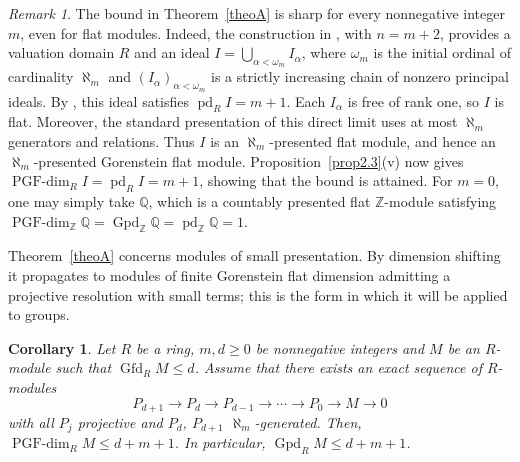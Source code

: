 \documentclass[12pt]{amsart}
\newtheorem{corollary}[theorem]{Corollary}
\theoremstyle{remark}
\newtheorem{remark}[theorem]{Remark}
\theoremstyle{definition}
\theoremstyle{plain}
\DeclareMathOperator{\Gfd}{Gfd}
\DeclareMathOperator{\Gpd}{Gpd}
\DeclareMathOperator{\pd}{pd}
\newcommand{\PGFdim}{\operatorname{PGF\text{-}dim}}
\newcommand{\Z}{\mathbb{Z}}
\newcommand{\Q}{\mathbb{Q}}
\newcommand{\alephm}{\aleph_m}
\begin{document}
\begin{remark}\label{rem4.2}The bound in Theorem~\ref{theoA} is sharp for every nonnegative
integer $m$, even for flat modules. Indeed, the construction
in \cite[proof of Proposition~2.62]{Oso}, with
$n=m+2$, provides a valuation domain $R$ and an ideal
$I=\bigcup_{\alpha<\omega_m}I_\alpha$,
where $\omega_m$ is the initial ordinal of cardinality
$\aleph_m$ and $(I_\alpha)_{\alpha<\omega_m}$ is a strictly
increasing chain of nonzero principal ideals.
By \cite[Theorem~2.57]{Oso}, this ideal satisfies
$\pd_RI=m+1$.
Each $I_\alpha$ is free of rank one, so $I$ is flat.
Moreover, the standard presentation of this direct limit
uses at most $\aleph_m$ generators and relations.
Thus $I$ is an $\aleph_m$-presented flat module, and hence
an $\aleph_m$-presented Gorenstein flat module.
Proposition~\ref{prop2.3}(v) now gives
$\PGFdim_RI
=\pd_RI
=m+1$,
showing that the bound is attained.
For $m=0$, one may simply take $\mathbb Q$, which is a
countably presented flat $\mathbb Z$-module satisfying
$\PGFdim_\Z\Q
=\Gpd_\Z\Q
=\pd_\Z\Q
=1$.
\end{remark}

Theorem~\ref{theoA} concerns modules of small presentation. By dimension shifting it propagates to modules of finite Gorenstein flat dimension admitting a projective resolution with small terms; this is the form in which it will be applied to groups.

\begin{corollary}\label{cor4.3}
Let $R$ be a ring, $m,d\ge0$ be nonnegative integers and $M$ be an $R$-module such that $\Gfd_RM\le d$. Assume that there exists an exact sequence of $R$-modules
\[
P_{d+1}\rightarrow P_d\rightarrow P_{d-1}\rightarrow\cdots\rightarrow P_0\rightarrow M\rightarrow0
\]
with all $P_j$ projective and $P_d$, $P_{d+1}$ $\alephm$-generated. Then, $\PGFdim_RM\le d+m+1$. In particular, $\Gpd_RM\le d+m+1$.
\end{corollary}
\end{document}
